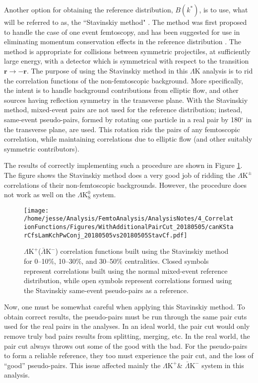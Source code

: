 \documentclass[ALICE,manyauthors]{cernphprep}
\newcommand{\LamK}{$\Lambda$K\xspace}
\newcommand{\LamKchP}{$\Lambda\mathrm{K^{+}}$\xspace}
\newcommand{\ALamKchM}{$\bar{\Lambda}\mathrm{K^{-}}$\xspace}
\newcommand{\LamKchPALamKchM}{$\Lambda\mathrm{K^{+}}$($\bar{\Lambda}\mathrm{K^{-}}$)\xspace}
\newcommand{\LamKpm}{$\Lambda\mathrm{K^{\pm}}$\xspace}
\newcommand{\LamKs}{$\Lambda\mathrm{K^{0}_{S}}$\xspace}
\begin{document}
Another option for obtaining the reference distribution, $B(k^{*})$, is to use, what will be referred to as, the ``Stavinskiy method" \cite{Stavinskiy04}.
The method was first proposed to handle the case of one event femtoscopy, and has been suggested for use in eliminating momentum conservation effects in the reference distribution \cite{Lisa:2005dd}.
The method is appropriate for collisions between symmetric projectiles, at sufficiently large energy, with a detector which is symmetrical with respect to the transition $\mathbf{r} \rightarrow \mathbf{-r}$.
The purpose of using the Stavinskiy method in this \LamK analysis is to rid the correlation functions of the non-femtoscopic background.  
More specifically, the intent is to handle background contributions from elliptic flow, and other sources having reflection symmetry in the transverse plane.  
With the Stavinskiy method, mixed-event pairs are not used for the reference distribution; instead, same-event pseudo-pairs, formed by rotating one particle in a real pair by 180$^\circ$ in the transverse plane, are used.  
This rotation rids the pairs of any femtoscopic correlation, while maintaining correlations due to elliptic flow (and other suitably symmetric contributors).

The results of correctly implementing such a procedure are shown in Figure \ref{fig:StavCfs_Correct_LamKchP}.  
The figure shows the Stavinskiy method does a very good job of ridding the \LamKpm correlations of their non-femtoscopic backgrounds.  
However, the procedure does not work as well on the \LamKs system.


\begin{figure}[h!]
  \centering
  \texttt{[image: /home/jesse/Analysis/FemtoAnalysis/AnalysisNotes/4\_CorrelationFunctions/Figures/WithAdditionalPairCut\_20180505/canKStarCfsLamKchPwConj\_20180505vs20180505StavCf.pdf]}
  \caption[\LamKchP Stavinskiy Correlation Functions]{\LamKchPALamKchM correlation functions built using the Stavinskiy method for 0--10\%, 10--30\%, and 30--50\% centralities.  Closed symbols represent correlations built using the normal mixed-event reference distribution, while open symbols represent correlations formed using the Stavinskiy same-event pseudo-pairs as a reference.}
  \label{fig:StavCfs_Correct_LamKchP}
\end{figure}

Now, one must be somewhat careful when applying this Stavinskiy method.  
To obtain correct results, the pseudo-pairs must be run through the same pair cuts used for the real pairs in the analyses.  
In an ideal world, the pair cut would only remove truly bad pairs results from splitting, merging, etc.  
In the real world, the pair cut always throws out some of the good with the bad.  
For the pseudo-pairs to form a reliable reference, they too must experience the pair cut, and the loss of ``good'' pseudo-pairs.  
This issue affected mainly the \LamKchP \& \ALamKchM system in this analysis.
\end{document}
